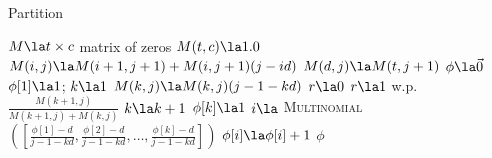 %
%	
%	

\begin{algorithm}
	\caption{Partition} \label{alg:samplepartition}
	\begin{algorithmic}[1]
	
		\State $M \la  t \times c$ matrix of zeros
		\State $M(t,c) \la 1.0$
				\State $M(i,j) \la M(i +1, j+1) + M(i,j+1)(j - id)$ 
			\EndFor
			\State $M(d,j) \la M(t,j+1)$
		\EndFor
		\State $\phi \la \vec 0$ 
		\State $\phi[1] \la 1$;  $k \la 1$
			\State $M(k,j) \la M(k,j)(j-1 -k d)$
			\State $r \la 0$
			\State $r \la 1 $ w.p. $\frac{M(k+1,j)}{M(k+1,j) + M(k,j)}$
				\State $k \la k + 1$
				\State $\phi[k]  \la 1$
			\Else
				\State $i \la$ \textsc{Multinomial}$([\frac{\phi[1] - d}{j-1 -kd}, \frac{\phi[2] - d}{j-1 -kd}, \ldots, \frac{\phi[k] - d}{j-1 -kd}])$
				\State $\phi[i] \la \phi[i] + 1$
			\EndIf
		\EndFor
		\State \Return $\phi$
	\EndFunction
		\end{algorithmic}
\end{algorithm}

%
%
%				
%

